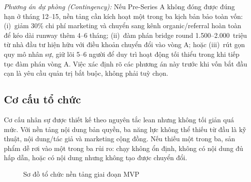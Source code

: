 \textit{Phương án dự phòng (Contingency):} Nếu Pre-Series A không đóng được đúng hạn ở tháng 12--15, nền tảng cần kích hoạt một trong ba kịch bản bảo toàn vốn: (i)~giảm 30\% chi phí marketing và chuyển sang kênh organic/referral hoàn toàn để kéo dài runway thêm 4--6 tháng; (ii)~đàm phán bridge round 1.500--2.000~triệu từ nhà đầu tư hiện hữu với điều khoản chuyển đổi vào vòng A; hoặc (iii)~rút gọn quy mô nhân sự, giữ lõi 5--6 người để duy trì hoạt động tối thiểu trong khi tiếp tục đàm phán vòng A. Việc xác định rõ các phương án này trước khi vốn bắt đầu cạn là yêu cầu quản trị bắt buộc, không phải tuỳ chọn.

\subsection{Cơ cấu tổ chức}

Cơ cấu nhân sự được thiết kế theo nguyên tắc lean nhưng không tối giản quá mức. Với nền tảng nội dung bản quyền, ba năng lực không thể thiếu từ đầu là kỹ thuật, nội dung/tác giả và marketing cộng đồng. Nếu thiếu một trong ba, sản phẩm dễ rơi vào một trong ba rủi ro: chạy không ổn định, không có nội dung đủ hấp dẫn, hoặc có nội dung nhưng không tạo được chuyển đổi.

\begin{figure}[H]
\centering
{}
\caption{Sơ đồ tổ chức nền tảng giai đoạn MVP}
\label{fig:org-chart}
\end{figure}

